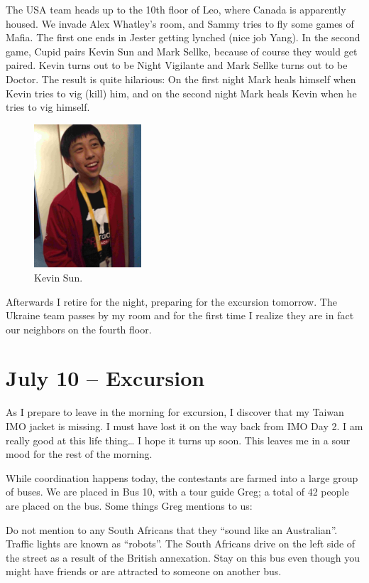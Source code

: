 \documentclass[11pt]{scrreprt}
\numberwithin{figure}{chapter}
\begin{document}
The USA team heads up to the 10th floor of Leo, where Canada is apparently housed.
We invade Alex Whatley's room, and Sammy tries to fly some games of Mafia.
The first one ends in Jester getting lynched (nice job Yang).
In the second game, Cupid pairs Kevin Sun and Mark Sellke, because of course they would get paired.
Kevin turns out to be Night Vigilante and Mark Sellke turns out to be Doctor.
The result is quite hilarious:
On the first night Mark heals himself when Kevin tries to vig (kill) him, and on the second night Mark heals Kevin when he tries to vig himself.

\begin{figure}[ht]
  \centering
  \includegraphics[width=4cm]{media/ksun.jpg}
  \caption{Kevin Sun.}
\end{figure}


Afterwards I retire for the night, preparing for the excursion tomorrow.
The Ukraine team passes by my room and for the first time I realize they are in fact our neighbors on the fourth floor.

\section{July 10 -- Excursion}
As I prepare to leave in the morning for excursion, I discover that my Taiwan IMO jacket is missing.
I must have lost it on the way back from IMO Day 2.
I am really good at this life thing\dots
I hope it turns up soon.
This leaves me in a sour mood for the rest of the morning.

While coordination happens today, the contestants are farmed into a large group of buses.
We are placed in Bus 10, with a tour guide Greg; a total of 42 people are placed on the bus.
Some things Greg mentions to us:
\begin{itemize}
  \ii Do not mention to any South Africans that they ``sound like an Australian''.
  \ii Traffic lights are known as ``robots''.
  \ii The South Africans drive on the left side of the street as a result of the British annexation.
  \ii Stay on this bus even though you might have friends or are attracted to someone on another bus.
\end{itemize}
\end{document}
